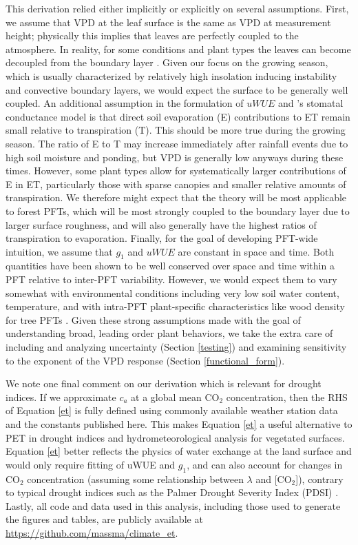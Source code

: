 This derivation relied either implicitly or explicitly on several
assumptions. First, we assume that VPD at the leaf surface is the same
as VPD at measurement height; physically this implies that leaves are
perfectly coupled to the atmosphere. In reality, for some conditions
and plant types the leaves can become decoupled from the boundary
layer \citep{De_2017, Medlyn_2017}. Given our focus on the growing
season, which is usually characterized by relatively high insolation
inducing instability and convective boundary layers, we would expect
the surface to be generally well coupled. An additional assumption in
the formulation of $uWUE$ \citep{Zhou_2014, Zhou_2015} and
\citet{Medlyn_2017}'s stomatal conductance model is that direct soil
evaporation (E) contributions to ET remain small relative to
transpiration (T). This should be more true during the growing
season. The ratio of E to T may increase immediately after rainfall
events due to high soil moisture and ponding, but VPD is generally low
anyways during these times. However, some plant types allow for
systematically larger contributions of E in ET, particularly those
with sparse canopies and smaller relative amounts of transpiration. We
therefore might expect that the theory will be most applicable to
forest PFTs, which will be most strongly coupled to the boundary layer
due to larger surface roughness, and will also generally have the
highest ratios of transpiration to evaporation. Finally, for the goal
of developing PFT-wide intuition, we assume that $g_1$ and $uWUE$ are
constant in space and time. Both quantities have been shown to be well
conserved over space and time within a PFT relative to inter-PFT
variability. However, we would expect them to vary somewhat with
environmental conditions including very low soil water content,
temperature, and with intra-PFT plant-specific characteristics like
wood density for tree PFTs \citep{Lin_2015}. Given these strong
assumptions made with the goal of understanding broad, leading order
plant behaviors, we take the extra care of including and analyzing
uncertainty (Section \ref{testing}) and examining sensitivity to the
exponent of the VPD response (Section \ref{functional_form}).

We note one final comment on our derivation which is relevant for
drought indices. If we approximate $c_a$ at a global mean CO$_2$
concentration, then the RHS of Equation \ref{et} is fully defined
using commonly available weather station data and the constants
published here. This makes Equation \ref{et} a useful alternative to
PET in drought indices and hydrometeorological analysis for vegetated
surfaces. Equation \ref{et} better reflects the physics of water
exchange at the land surface and would only require fitting of uWUE
and $g_1$, and can also account for changes in CO$_2$ concentration
(assuming some relationship between $\lambda$ and [CO$_2$]), contrary
to typical drought indices such as the Palmer Drought Severity Index
(PDSI) \citep{Swann_2016, Lemordant_2016, Lemordant_2018}. Lastly, all
code and data used in this analysis, including those used to generate
the figures and tables, are publicly available at
\url{https://github.com/massma/climate\_et}.

